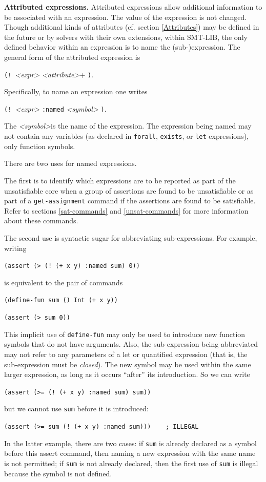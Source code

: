 \documentclass[12pt,oneside]{report}
\newcommand{\sym}{{\it <symbol>}}
\begin{document}
{\bf Attributed expressions.} Attributed expressions allow additional information to be associated with an expression. The value of the expression is not changed.
Though additional kinds of attributes (cf. section \ref{Attributes}) may be defined in the future or by solvers with their own extensions, within SMT-LIB, the only defined behavior within an expression is to name the (sub-)expression. 
The general form of the attributed expression is\\
\centerline{{\tt (! }{\it <expr>} {\it <attribute>}+ {\tt )}.}
Specifically, to name an expression one writes\\
\centerline{{\tt (! }{\it <expr>} {\tt :named} {\it <symbol>} {\tt )}.}
The \sym is the name of the expression. The expression being named may not contain any variables (as declared in {\tt forall}, {\tt exists}, or {\tt let} expressions), only function symbols.

There are two uses for named expressions. 

The first is to identify which expressions are to be reported as part of the unsatisfiable core when a group of assertions are found to be unsatisfiable or as part of a {\tt get-assignment} command if the assertions are found to be satisfiable. Refer to sections \ref{sat-commands}
and \ref{unsat-commands} for more information about these commands. 

The second use is syntactic sugar for abbreviating sub-expressions.  For example, writing\\
\centerline{\tt (assert (> (! (+ x y) :named sum) 0))}
is equivalent to the pair of commands\\
\centerline{\tt (define-fun sum () Int (+ x y))}
\centerline{\tt (assert (> sum 0))}

This implicit use of {\tt define-fun} may only be used to introduce new function symbols that do not have arguments. Also, the sub-expression being abbreviated may not refer to any parameters of a let or quantified expression (that is, the sub-expression must be {\it closed}).  The new 
symbol may be used within the same larger expression, as long as it occurs ``after'' its introduction.  So we can write\\
\centerline{\tt (assert (>= (! (+ x y) :named sum) sum))}
but we cannot use {\tt sum} before it is introduced:\\
\centerline{\tt (assert (>= sum (! (+ x y) :named sum)))\ \ \ \ ; ILLEGAL}
In the latter example, there are two cases: if {\tt sum} is already declared as a symbol before this assert command, then naming a new
expression with the same name is not permitted; if {\tt sum} is not already declared, then the first use of {\tt sum} is illegal because
the symbol is not defined.
\end{document}
